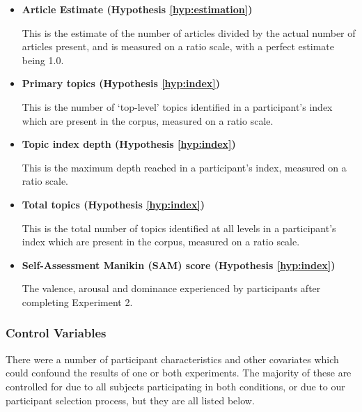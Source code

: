 \begin{itemize}
	\item\textbf{Article Estimate (Hypothesis \ref{hyp:estimation})} \par
		This is the estimate of the number of articles divided by the actual number of articles present, and is measured on a ratio scale, with a perfect estimate being 1.0. 
	\item\textbf{Primary topics (Hypothesis \ref{hyp:index})} \par
		This is the number of `top-level' topics identified in a participant's index which are present in the corpus, measured on a ratio scale.
	\item\textbf{Topic index depth (Hypothesis \ref{hyp:index})} \par
		This is the maximum depth reached in a participant's index, measured on a ratio scale.
	\item\textbf{Total topics (Hypothesis \ref{hyp:index})} \par
		This is the total number of topics identified at all levels in a participant's index which are present in the corpus, measured on a ratio scale.
	\item\textbf{Self-Assessment Manikin (SAM) score (Hypothesis \ref{hyp:index})} \par
		The valence, arousal and dominance experienced by participants after completing Experiment 2.

\end{itemize}

\subsubsection{Control Variables}
There were a number of participant characteristics and other covariates which could confound the results of one or both experiments. The majority of these are controlled for due to all subjects participating in both conditions, or due to our participant selection process, but they are all listed below.

